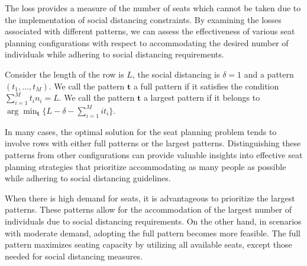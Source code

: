 The loss provides a measure of the number of seats which cannot be taken due to the implementation of social distancing constraints. By examining the losses associated with different patterns, we can assess the effectiveness of various seat planning configurations with respect to accommodating the desired number of individuals while adhering to social distancing requirements.

\begin{definition}
Consider the length of the row is $L$, the social distancing is $\delta=1$ and a pattern $(t_1, \ldots, t_M)$.
We call the pattern $\bm{t}$ a full pattern if it satisfies the condition $\sum_{i=1}^{M} t_i n_i = L$. We call the pattern $\bm{t}$ a largest pattern if it belongs to $\arg\min_{\bm{t}} \{L - \delta - \sum_{i =1}^{M} i t_i\}$.




\end{definition}

In many cases, the optimal solution for the seat planning problem tends to involve rows with either full patterns or the largest patterns. Distinguishing these patterns from other configurations can provide valuable insights into effective seat planning strategies that prioritize accommodating as many people as possible while adhering to social distancing guidelines.

When there is high demand for seats, it is advantageous to prioritize the largest patterns. These patterns allow for the accommodation of the largest number of individuals due to social distancing requirements. On the other hand, in scenarios with moderate demand, adopting the full pattern becomes more feasible. The full pattern maximizes seating capacity by utilizing all available seats, except those needed for social distancing measures.

